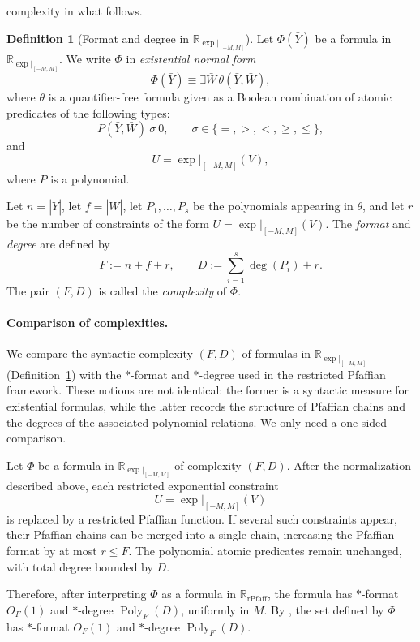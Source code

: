 \documentclass[11pt]{article}
\theoremstyle{plain}
\theoremstyle{definition}
\newtheorem{definition}[theorem]{Definition}
\theoremstyle{remark}
\newcommand{\R}{\mathbb{R}}
\newcommand{\Poly}{\operatorname{Poly}}
\newcommand{\rPfaff}{\operatorname{rPfaff}}
\begin{document}
complexity in what follows.

\begin{definition}[Format and degree in $\R_{\exp|_{[-M,M]}}$]
\label{def:format_degree_Rexp_restricted}
Let $\Phi(\bar Y)$ be a formula in $\R_{\exp|_{[-M,M]}}$.
We write $\Phi$ in \emph{existential normal form}
\[
  \Phi(\bar Y) \equiv \exists \bar W\,\theta(\bar Y,\bar W),
\]
where $\theta$ is a quantifier-free formula given as a Boolean combination
of atomic predicates of the following types:
\[
  P(\bar Y,\bar W)\ \sigma\ 0,
  \qquad \sigma\in\{=,>,<,\ge,\le\},
\]
and
\[
  U=\exp|_{[-M,M]}(V),
\]
where $P$ is a polynomial.

Let $n=|\bar Y|$, let $f=|\bar W|$, let $P_1,\dots,P_s$ be the
polynomials appearing in $\theta$, and let $r$ be the number of
constraints of the form $U=\exp|_{[-M,M]}(V)$.
The \emph{format} and \emph{degree} are defined by
\[
  F := n + f + r,
  \qquad
  D := \sum_{i=1}^s \deg(P_i) + r.
\]
The pair $(F,D)$ is called the \emph{complexity} of $\Phi$.
\end{definition}

\paragraph{Comparison of complexities.}
We compare the syntactic complexity $(F,D)$ of formulas in
$\R_{\exp|_{[-M,M]}}$ (Definition~\ref{def:format_degree_Rexp_restricted})
with the $*$-format and $*$-degree used in the restricted Pfaffian
framework. These notions are not identical: the former is a syntactic
measure for existential formulas, while the latter records the structure
of Pfaffian chains and the degrees of the associated polynomial relations.
We only need a one-sided comparison.

Let $\Phi$ be a formula in $\R_{\exp|_{[-M,M]}}$ of complexity $(F,D)$.
After the normalization described above, each restricted exponential
constraint
\[
  U=\exp|_{[-M,M]}(V)
\]
is replaced by a restricted Pfaffian function. If several such constraints
appear, their Pfaffian chains can be merged into a single chain, increasing
the Pfaffian format by at most $r\le F$. The polynomial atomic predicates
remain unchanged, with total degree bounded by $D$.

Therefore, after interpreting $\Phi$ as a formula in $\R_{\rPfaff}$, the
formula has $*$-format $O_F(1)$ and $*$-degree $\Poly_F(D)$, uniformly in
$M$. By , the set defined by $\Phi$ has
$*$-format $O_F(1)$ and $*$-degree $\Poly_F(D)$.
\end{document}
